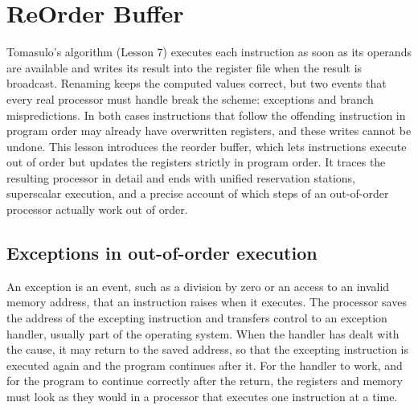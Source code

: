 \documentclass[../main.tex]{subfiles}
\begin{document}
\chapter{ReOrder Buffer}

Tomasulo's algorithm (Lesson 7) executes each instruction as soon as its
operands are available and writes its result into the register file when the
result is broadcast.  Renaming keeps the computed values correct, but two
events that every real processor must handle break the scheme: exceptions and
branch mispredictions.  In both cases instructions that follow the offending
instruction in program order may already have overwritten registers, and these
writes cannot be undone.  This lesson introduces the reorder buffer, which
lets instructions execute out of order but updates the registers strictly in
program order.  It traces the resulting processor in detail and ends with
unified reservation stations, superscalar execution, and a precise account of
which steps of an out-of-order processor actually work out of order.

\section{Exceptions in out-of-order execution}
\label{sec:l08-exceptions-ooo}

An exception is an event, such as a division by zero or an access to an
invalid memory address, that an instruction raises when it
executes.  The processor
saves the address of the excepting instruction and transfers control to an
exception handler, usually part of the operating system.  When the
handler
has dealt with the cause, it may return to the saved address, so that the
excepting instruction is executed again and the program continues after it.
For the handler to work, and for the program to continue correctly after the
return, the registers and memory must look as they would in a processor that
executes one instruction at a time.
\end{document}
